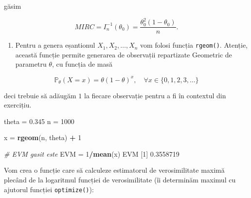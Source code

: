 \documentclass[]{article}
\newenvironment{Shaded}{\begin{snugshade}}{\end{snugshade}}
\newcommand{\KeywordTok}[1]{\textcolor[rgb]{0.13,0.29,0.53}{\textbf{#1}}}
\newcommand{\DecValTok}[1]{\textcolor[rgb]{0.00,0.00,0.81}{#1}}
\newcommand{\FloatTok}[1]{\textcolor[rgb]{0.00,0.00,0.81}{#1}}
\newcommand{\StringTok}[1]{\textcolor[rgb]{0.31,0.60,0.02}{#1}}
\newcommand{\CommentTok}[1]{\textcolor[rgb]{0.56,0.35,0.01}{\textit{#1}}}
\newcommand{\OperatorTok}[1]{\textcolor[rgb]{0.81,0.36,0.00}{\textbf{#1}}}
\newcommand{\NormalTok}[1]{#1}
\providecommand{\tightlist}{%
  \setlength{\itemsep}{0pt}\setlength{\parskip}{0pt}}
\begin{document}
găsim

\[
  MIRC = I_n^{-1}(\theta_0) = \frac{\theta_0^2(1-\theta_0)}{n}.
\]

\begin{enumerate}
\def\labelenumi{\alph{enumi})}
\setcounter{enumi}{6}
\tightlist
\item
  Pentru a genera eșantionul \(X_1, X_2, \ldots, X_n\) vom folosi
  funcția \texttt{rgeom()}. Atenție, această funcție permite generarea
  de observații repartizate Geometric de parametru \(\theta\), cu
  funcția de masă
\end{enumerate}

\[
 \mathbb{P}_{\theta}(X = x) = \theta (1-\theta)^{x}, \quad \forall x\in\{0,1,2,3,\ldots\}  
\]

deci trebuie să adăugăm \(1\) la fiecare observație pentru a fi în
contextul din exercițiu.

\begin{Shaded}
\begin{Highlighting}[]
\NormalTok{theta =}\StringTok{ }\FloatTok{0.345}
\NormalTok{n =}\StringTok{ }\DecValTok{1000}

\NormalTok{x =}\StringTok{ }\KeywordTok{rgeom}\NormalTok{(n, theta) }\OperatorTok{+}\StringTok{ }\DecValTok{1}

\CommentTok{# EVM gasit este }
\NormalTok{EVM =}\StringTok{ }\DecValTok{1}\OperatorTok{/}\KeywordTok{mean}\NormalTok{(x)}
\NormalTok{EVM}
\NormalTok{[}\DecValTok{1}\NormalTok{] }\FloatTok{0.3558719}
\end{Highlighting}
\end{Shaded}

Vom crea o funcție care să calculeze estimatorul de verosimilitate
maximă plecând de la logaritmul funcției de verosimilitate (îi
determinăm maximul cu ajutorul funcției \texttt{optimize()}):
\end{document}

